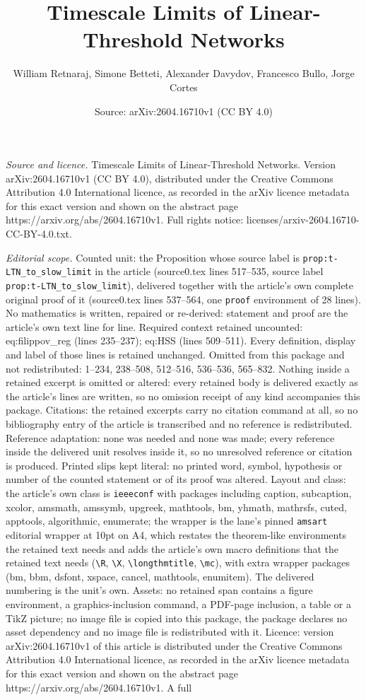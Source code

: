 \documentclass[10pt,a4paper]{amsart}
\title[Timescale Limits of Linear-Threshold Networks]{Timescale Limits of Linear-Threshold Networks}
\author{William Retnaraj, Simone Betteti, Alexander Davydov, Francesco Bullo, Jorge Cortes}
\date{Source: arXiv:2604.16710v1 (CC BY 4.0)}
\begin{document}
\maketitle

\noindent\emph{Source and licence.} Timescale Limits of Linear-Threshold Networks. Version arXiv:2604.16710v1 (CC BY 4.0), distributed under the Creative Commons Attribution 4.0 International licence, as recorded in the arXiv licence metadata for this exact version and shown on the abstract page https://arxiv.org/abs/2604.16710v1. Full rights notice: licenses/arxiv-2604.16710-CC-BY-4.0.txt.\par\smallskip

\noindent\textit{Editorial scope.} Counted unit: the Proposition whose source label is \texttt{prop:t-LTN\_to\_slow\_limit} in the article (source0.tex lines 517--535, source label \texttt{prop:t-LTN\_to\_slow\_limit}), delivered together with the article's own complete original proof of it (source0.tex lines 537--564, one \texttt{proof} environment of 28 lines). No mathematics is written, repaired or re-derived: statement and proof are the article's own text line for line. Required context retained uncounted: eq:filippov\_reg (lines 235--237); eq:HSS (lines 509--511). Every definition, display and label of those lines is retained unchanged. Omitted from this package and not redistributed: 1--234, 238--508, 512--516, 536--536, 565--832. Nothing inside a retained excerpt is omitted or altered: every retained body is delivered exactly as the article's lines are written, so no omission receipt of any kind accompanies this package. Citations: the retained excerpts carry no citation command at all, so no bibliography entry of the article is transcribed and no reference is redistributed. Reference adaptation: none was needed and none was made; every reference inside the delivered unit resolves inside it, so no unresolved reference or citation is produced. Printed slips kept literal: no printed word, symbol, hypothesis or number of the counted statement or of its proof was altered. Layout and class: the article's own class is \texttt{ieeeconf} with packages including caption, subcaption, xcolor, amsmath, amssymb, upgreek, mathtools, bm, yhmath, mathrsfs, cuted, apptools, algorithmic, enumerate; the wrapper is the lane's pinned \texttt{amsart} editorial wrapper at 10pt on A4, which restates the theorem-like environments the retained text needs and adds the article's own macro definitions that the retained text needs (\texttt{\textbackslash R}, \texttt{\textbackslash X}, \texttt{\textbackslash longthmtitle}, \texttt{\textbackslash mc}), with extra wrapper packages (bm, bbm, dsfont, xspace, cancel, mathtools, enumitem). The delivered numbering is the unit's own. Assets: no retained span contains a figure environment, a graphics-inclusion command, a PDF-page inclusion, a table or a TikZ picture; no image file is copied into this package, the package declares no asset dependency and no image file is redistributed with it. Licence: version arXiv:2604.16710v1 of this article is distributed under the Creative Commons Attribution 4.0 International licence, as recorded in the arXiv licence metadata for this exact version and shown on the abstract page https://arxiv.org/abs/2604.16710v1. A full 
\end{document}
